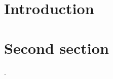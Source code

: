 \documentclass{article}
\begin{document}
\tableofcontents

\section{Introduction}


\clearpage

\section{Second section}
.

\printindex
\end{document}
